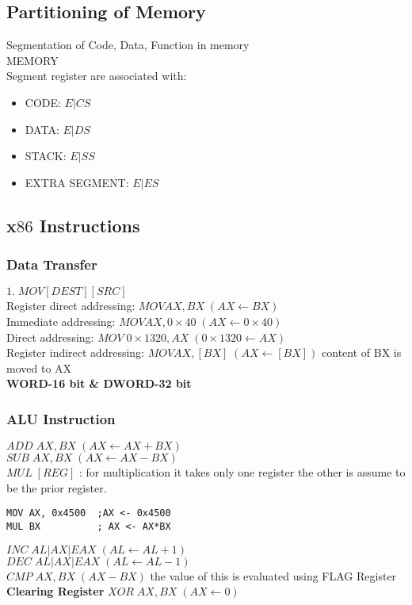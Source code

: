 \documentclass[12pt,a4paper]{article}
\begin{document}
\subsection{Partitioning of Memory}
Segmentation of Code, Data, Function in memory\\
MEMORY 
\\
Segment register are associated with: 
\begin{itemize}
	\item CODE: $E|CS$
	\item DATA: $E|DS$
	\item STACK: $E|SS$
	\item EXTRA SEGMENT: $E|ES$
\end{itemize}

\subsection{x$86$ Instructions}
\subsubsection{Data Transfer}
$1.\; MOV [DEST][SRC]$\\
Register direct addressing: $MOV AX, BX \;(AX \leftarrow BX)$ \\
Immediate addressing: $MOV AX, 0\times40 \;(AX \leftarrow 0\times40)$ \\
Direct addressing: $MOV\; 0\times1320, AX \;(0\times1320 \leftarrow AX)$ \\
Register indirect addressing: $MOV AX, [BX] \;(AX \leftarrow [BX])$ content of BX is moved to AX \\
\textbf{WORD-16 bit \& DWORD-32 bit}
\subsubsection{ALU Instruction}
$ADD \;AX, BX\; (AX \leftarrow AX+BX)$ \\
$SUB \;AX, BX\; (AX \leftarrow AX-BX)$ \\
$MUL \;[REG]$ : for multiplication it takes only one register the other is assume to be the prior register.\\
\begin{lstlisting}[language=Ant, caption=MUL example]
MOV AX, 0x4500	;AX <- 0x4500
MUL BX			; AX <- AX*BX
\end{lstlisting}
$INC \; AL|AX|EAX\; (AL\leftarrow AL+1)$\\
$DEC \; AL|AX|EAX\; (AL\leftarrow AL-1)$ \\
$CMP \; AX, BX \; (AX-BX)$ the value of this is evaluated using FLAG Register\\
\textbf{Clearing Register}
$XOR \; AX, BX \; (AX \leftarrow 0)$
\end{document}
